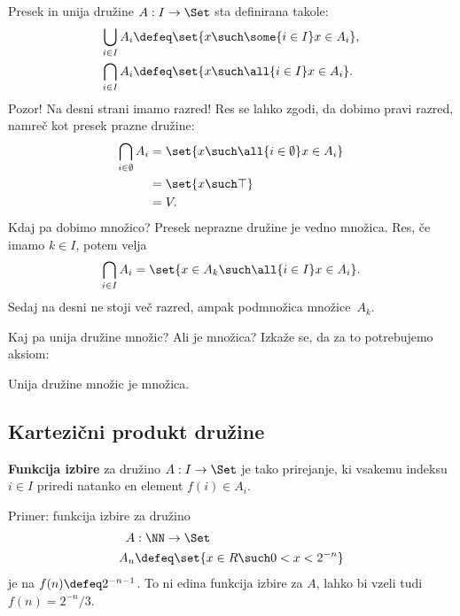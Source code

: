 Presek in unija družine $A : I \to \Set$ sta definirana takole:
%
\begin{align*}
  \bigcup_{i \in I} A_i &\defeq \set{ x \such \some{i \in I} x \in A_i },
  \\
  \bigcap_{i \in I} A_i &\defeq \set{ x \such \all{ i \in I} x \in A_i }.
\end{align*}
%
Pozor! Na desni strani imamo razred! Res se lahko zgodi, da dobimo pravi razred, namreč
kot presek prazne družine:
%
\begin{align*}
  \bigcap_{i \in \emptyset} A_i
  &= \set{ x \such \all{ i \in \emptyset} x \in A_i } \\
  &= \set { x \such \top } \\
  &= V.
\end{align*}
%
Kdaj pa dobimo množico? Presek neprazne družine je vedno množica. Res, če imamo
$k \in I$, potem velja
%
\begin{equation*}
    \bigcap_{i \in I} A_i = \set{ x \in A_k \such \all{i \in I} x \in A_i}.
\end{equation*}
%
Sedaj na desni ne stoji več razred, ampak podmnožica množice~$A_k$.

Kaj pa unija družine množic? Ali je množica? Izkaže se, da za to potrebujemo aksiom:

\begin{aksiom}
  Unija družine množic je množica.
\end{aksiom}


\subsection{Kartezični produkt družine}

\begin{definicija}
  \textbf{Funkcija izbire} za družino $A : I \to \Set$ je tako prirejanje, ki vsakemu indeksu $i \in I$ priredi natanko en element $f(i) \in A_i$.
 \end{definicija}

 \begin{primer}
   Primer: funkcija izbire za družino
   \begin{align*}
   A &: \NN \to \Set \\
   A_n &\defeq \set{ x \in R \such 0 < x < 2^{-n} }
   \end{align*}
   je na $f(n) \defeq 2^{-n - 1}$. To ni edina funkcija izbire za $A$, lahko bi vzeli tudi $f(n) = 2^{-n} / 3$.
 \end{primer}

